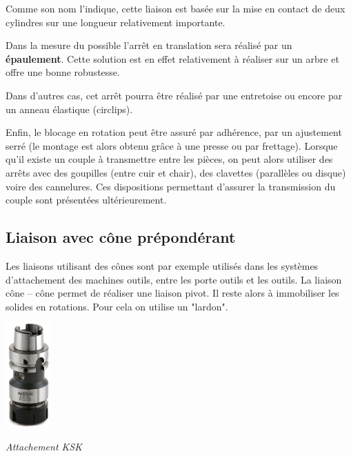 \documentclass[11pt,oneside]{article}
\begin{document}
\vspace{.5cm}

Comme son nom l'indique, cette liaison est basée sur la mise en contact de deux cylindres sur une longueur relativement importante. 

Dans la mesure du possible l'arrêt en translation sera réalisé par un \textbf{épaulement}. Cette solution est en effet relativement à réaliser sur un arbre et offre une bonne robustesse. 

Dans d'autres cas, cet arrêt pourra être réalisé par une entretoise ou encore par un anneau élastique (circlips). 

Enfin, le blocage en rotation peut être assuré par adhérence, par un ajustement serré (le montage est alors obtenu grâce à une presse ou par frettage). Lorsque qu'il existe un couple à transmettre entre les pièces, on peut alors utiliser des arrêts avec des goupilles (entre cuir et chair), des clavettes (parallèles ou disque) voire des cannelures. Ces dispositions permettant d'assurer la transmission du couple sont présentées ultérieurement. 

\subsection{Liaison avec cône prépondérant}
\begin{minipage}[c]{.7\linewidth}
Les liaisons utilisant des cônes sont par exemple utilisés dans les systèmes d'attachement des machines outils, entre les porte outils et les outils. La liaison cône -- cône permet de réaliser une liaison pivot. Il reste alors à immobiliser les solides en rotations. Pour cela on utilise un "lardon". 
\end{minipage}\hfill
\begin{minipage}[c]{.25\linewidth}
\begin{center}
\includegraphics[height=4cm]{png/hsk}

\textit{Attachement KSK \cite{attachements_2}}
\end{center}
\end{minipage}
\end{document}
